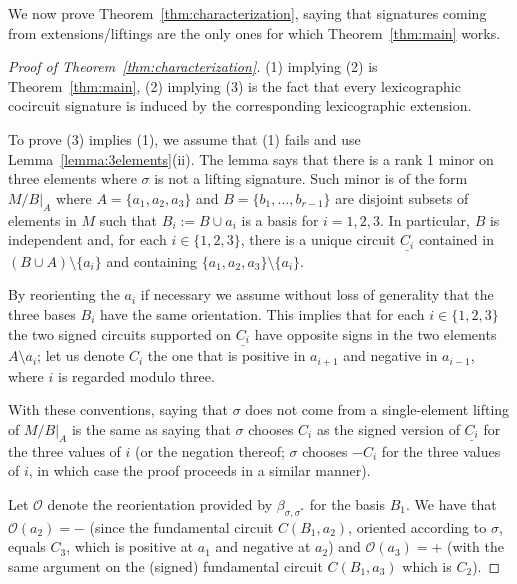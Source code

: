 \documentclass[12pt]{amsart}
\numberwithin{equation}{section}
\theoremstyle{definition}
\newcommand{\Ocal}{{\mathcal O}}
\newcommand{\paco}[1]{\todo[color=orange!30]{\footnotesize \rm #1 \\ \hfill --- P.}}
\begin{document}
We now prove Theorem~\ref{thm:characterization}, saying
that signatures coming from extensions/liftings are the only ones for which Theorem~\ref{thm:main} works.


\begin{proof}[Proof of Theorem~\ref{thm:characterization}]
(1) implying (2) is Theorem~\ref{thm:main}, 
(2) implying (3) is the fact that every lexicographic cocircuit signature is induced by the corresponding lexicographic extension.

To prove (3) implies (1), we assume that (1) fails and 
use Lemma~\ref{lemma:3elements}(ii). The lemma says that there is a rank 1 minor on three elements where $\sigma$ is not a lifting signature. Such minor is of the form $M/B|_A$ where $A=\{a_1,a_2,a_3\}$ and 
 $B=\{b_1,\dots,b_{r-1}\}$ are disjoint subsets of elements in $M$ such that $B_i:=B\cup a_i$ is a basis for $i=1,2,3$. In particular, $B$ is independent and, for each $i\in\{1,2,3\}$, there is a unique circuit $\underline{C_i}$ contained in $(B\cup A) \setminus \{a_i\}$ and containing $\{a_1,a_2,a_3\}\setminus \{a_i\}$.

 By reorienting the $a_i$ if necessary we assume without loss of generality that the three bases $B_i$ have the same orientation. This implies that 
 for each $i \in \{1,2,3\}$ the two signed circuits supported on $\underline{C_i}$ have opposite signs in the two elements $A\setminus a_i$; let us denote $C_i$ the one that is positive in $a_{i+1}$ and negative in $a_{i-1}$, where $i$ is regarded modulo three.

With these conventions, saying that  $\sigma$
does not come from a single-element lifting of $M/B|_A$ is the same as saying that $\sigma$ chooses $C_i$ as the signed version of $\underline{C_i}$ for the three values of $i$  (or the negation thereof; $\sigma$ chooses $-C_i$ for the three values of $i$, in which case the proof proceeds in a similar manner).

Let $\Ocal$ denote the reorientation provided by $\beta_{\sigma,\sigma^*}$ for the basis $B_1$.
We have that $\Ocal(a_{2})=-$ 
(since the fundamental circuit $C(B_1,a_2)$, oriented according to $\sigma$, equals $C_3$, which is positive at $a_1$ and negative at $a_2$)
and $\Ocal(a_3)=+$ (with the same argument on the (signed) fundamental circuit  $C(B_1,a_3)$ which is $C_2$).


\end{proof}
\end{document}
